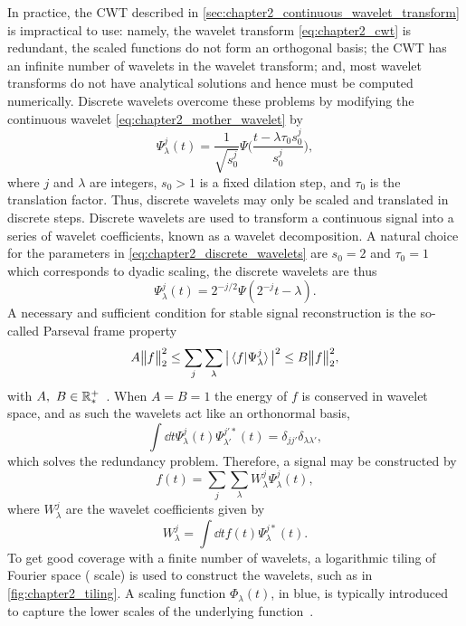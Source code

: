 In practice, the CWT described in \cref{sec:chapter2_continuous_wavelet_transform} is impractical to use: namely, the wavelet transform \cref{eq:chapter2_cwt} is redundant, \ie{} the scaled functions do not form an orthogonal basis; the CWT has an infinite number of wavelets in the wavelet transform; and, most wavelet transforms do not have analytical solutions and hence must be computed numerically.
Discrete wavelets overcome these problems by modifying the continuous wavelet \cref{eq:chapter2_mother_wavelet} by
%
\begin{equation}\label{eq:chapter2_discrete_wavelets}
	\Psi^{j}_{\lambda}(t)
	= \frac{1}{\sqrt{s^{j}_{0}}} \Psi\Bigg(\frac{t - \lambda\tau_{0}s^{j}_{0}}{s^{j}_{0}}\Bigg),
\end{equation}
%
where \(j\) and \(\lambda{}\) are integers, \(s_{0}>1\) is a fixed dilation step, and \(\tau_{0}\) is the translation factor.
Thus, discrete wavelets may only be scaled and translated in discrete steps.
Discrete wavelets are used to transform a continuous signal into a series of wavelet coefficients, known as a wavelet decomposition.
A natural choice for the parameters in \cref{eq:chapter2_discrete_wavelets} are \(s_{0}=2\) and \(\tau_{0}=1\) which corresponds to dyadic scaling, the discrete wavelets are thus
%
\begin{equation}
	\Psi^{j}_{\lambda}(t)
	= 2^{-j/2} \Psi(2^{-j}t - \lambda).
\end{equation}
%
A necessary and sufficient condition for stable signal reconstruction is the so-called Parseval frame property
%
\begin{equation}
	A {\big\lVert f\big\rVert}_{2}^{2}
	\leq \sum\limits_{j} \sum\limits_{\lambda} \big\lvert\braket*{f}{\Psi^{j}_{\lambda}}\big\rvert^{2}
	\leq B {\big\lVert f\big\rVert}_{2}^{2},
\end{equation}
%
with \(A,\ B \in \mathbb{R}_{\ast}^{+}{}\)~\cite{Daubechies1992}.
When \(A=B=1\) the energy of \(f\) is conserved in wavelet space, and as such the wavelets act like an orthonormal basis, \ie{}
%
\begin{equation}
	\int\dd{t} \Psi^{j}_{\lambda}(t) \Psi^{j'\ast}_{\lambda'}(t)
	= \delta_{j j'} \delta_{\lambda\lambda'},
\end{equation}
%
which solves the redundancy problem.
Therefore, a signal may be constructed by~\cite{Sheng2010}
%
\begin{equation}
	f(t)
	= \sum\limits_{j} \sum\limits_{\lambda} W^{j}_{\lambda} \Psi^{j}_{\lambda}(t),
\end{equation}
%
where \(W^{j}_{\lambda}\) are the wavelet coefficients given by
%
\begin{equation}
	W^{j}_{\lambda}
	= \int\dd{t} f(t) \Psi^{j\ast}_{\lambda}(t).
\end{equation}
%
To get good coverage with a finite number of wavelets, a logarithmic tiling of Fourier space (\ie{} scale) is used to construct the wavelets, such as in \cref{fig:chapter2_tiling}.
A scaling function \(\Phi_{\lambda}(t)\), in blue, is typically introduced to capture the lower scales of the underlying function~\cite{Mallat1989}.

